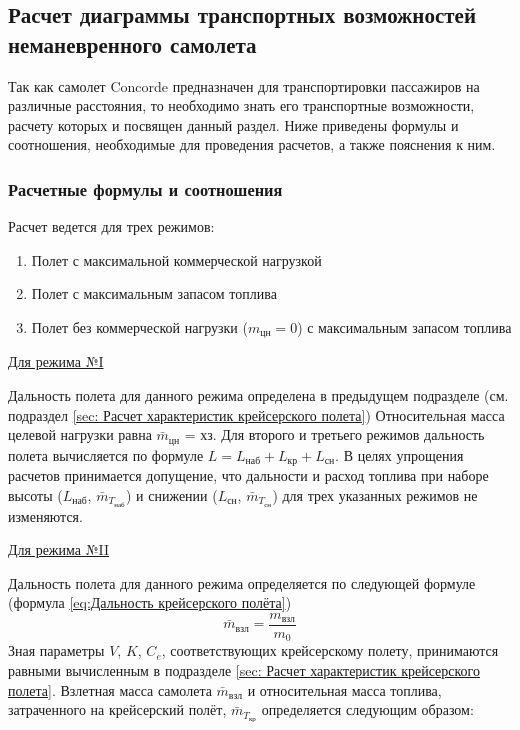 \subsection{Расчет диаграммы транспортных возможностей неманевренного
самолета}
\label{sec:Расчет диаграммы транспортных возможностей неманевренного
самолета}
\pagestyle{fancy}
\fancyhf{}
\rfoot{\thepage}



\pagestyle{fancy}
\fancyhf{}
\rfoot{\thepage}

Так как самолет Concorde предназначен для транспортировки пассажиров на различные расстояния, то необходимо знать его транспортные возможности, расчету которых и посвящен данный раздел. Ниже приведены формулы и соотношения, необходимые для проведения расчетов, а также пояснения к ним. 

\subsubsection{Расчетные формулы и соотношения}

Расчет ведется для трех режимов: 

\begin{enumerate}
    \item Полет с максимальной коммерческой нагрузкой
    \item Полет с максимальным запасом топлива
    \item Полет без коммерческой нагрузки ($m_\text{цн} = 0$) с максимальным запасом топлива
\end{enumerate}

\underline{Для режима №I} 

Дальность полета для данного режима определена в предыдущем подразделе (см. подраздел \ref{sec: Расчет характеристик крейсерского полета}) Относительная масса целевой нагрузки равна $\bar{m}_\text{цн}$ = хз. Для второго и третьего режимов дальность полета вычисляется по формуле $L = L_\text{наб} + L_\text{кр} + L_\text{сн}$. В целях упрощения расчетов принимается допущение, что дальности и расход топлива при наборе высоты ($L_\text{наб}$, $\bar{m}_{T_\text{наб}}$) и снижении ($L_\text{сн}$, $\bar{m}_{T_\text{сн}}$) для трех указанных режимов не изменяются. 

\underline{Для режима №II} 

Дальность полета для данного режима определяется по следующей формуле
(формула \ref{eq:Дальность крейсерского полёта})
$$\bar{m}_\text{взл} = \frac{m_\text{взл}}{m_0}$$
Зная параметры $V$, $K$, $C_e$, соответствующих крейсерскому
полету, принимаются равными вычисленным в подразделе \ref{sec: Расчет характеристик крейсерского полета}. Взлетная масса самолета $\bar{m}_\text{взл}$ и относительная масса топлива, затраченного на крейсерский полёт, $\bar{m}_{T_\text{кр}}$ определяется следующим образом:

